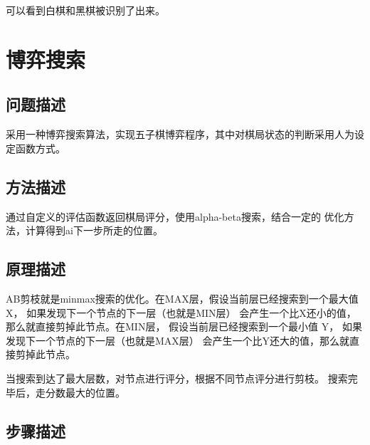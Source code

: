 \documentclass[UTF8]{article}
\begin{document}
可以看到白棋和黑棋被识别了出来。

\section{博弈搜索}
\subsection{问题描述}
采用一种博弈搜索算法，实现五子棋博弈程序，其中对棋局状态的判断采用人为设
定函数方式。
\subsection{方法描述}

通过自定义的评估函数返回棋局评分，使用alpha-beta搜索，结合一定的
优化方法，计算得到ai下一步所走的位置。

\subsection{原理描述}

AB剪枝就是minmax搜索的优化。在MAX层，假设当前层已经搜索到一个最大值 X， 
如果发现下一个节点的下一层（也就是MIN层）
会产生一个比X还小的值，那么就直接剪掉此节点。在MIN层，
假设当前层已经搜索到一个最小值 Y， 如果发现下一个节点的下一层（也就是MAX层）
会产生一个比Y还大的值，那么就直接剪掉此节点。

当搜索到达了最大层数，对节点进行评分，根据不同节点评分进行剪枝。
搜索完毕后，走分数最大的位置。

\subsection{步骤描述}
\end{document}
